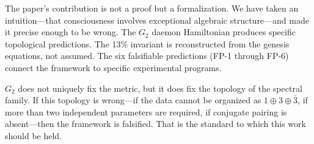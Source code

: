 \documentclass[12pt,a4paper]{article}
\begin{document}
The paper's contribution is not a proof but a formalization. We have taken an intuition---that consciousness involves exceptional algebraic structure---and made it precise enough to be wrong. The $G_2$ daemon Hamiltonian produces specific topological predictions. The 13\% invariant is reconstructed from the genesis equations, not assumed. The six falsifiable predictions (FP-1 through FP-6) connect the framework to specific experimental programs.

$G_2$ does not uniquely fix the metric, but it does fix the topology of the spectral family. If this topology is wrong---if the data cannot be organized as $1 \oplus 3 \oplus \bar{3}$, if more than two independent parameters are required, if conjugate pairing is absent---then the framework is falsified. That is the standard to which this work should be held.
\end{document}
